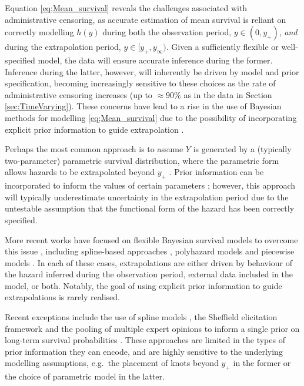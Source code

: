 \documentclass[ba,preprint]{imsart}
\theoremstyle{plain}
\theoremstyle{definition}
\theoremstyle{remark}
\begin{document}
Equation \eqref{eq;Mean_survival} reveals the challenges associated with administrative censoring, as accurate estimation of mean survival is reliant on correctly modelling $h(y)$ during both the observation period, $y \in (0,y_+)$, \textit{and} during the extrapolation period, $y \in [y_+,y_\infty)$. Given a sufficiently flexible or well-specified model, the data will ensure accurate inference during the former. Inference during the latter, however, will inherently be driven by model and prior specification, becoming increasingly sensitive to these choices as the rate of administrative censoring increases (up to $\approx 90\%$ as in the data in Section \ref{sec;TimeVarying}). These concerns have lead to a rise in the use of Bayesian methods for modelling \eqref{eq;Mean_survival} due to the possibility of incorporating explicit prior information to guide extrapolation \citep{Baio2020, Rutherford2020}.

Perhaps the most common approach is to assume $Y$ is generated by a (typically two-parameter) parametric survival distribution, where the parametric form allows hazards to be extrapolated beyond $y_+$ \citep{Latimer2011}. Prior information can be incorporated to inform the values of certain parameters \citep{Palmer2023}; however, this approach will typically underestimate uncertainty in the extrapolation period due to the untestable assumption that the functional form of the hazard has been correctly specified. 

More recent works have focused on flexible Bayesian survival models to overcome this issue \citep{Rutherford2020}, including spline-based approaches \citep{Jackson2023}, polyhazard models \citep{Demiris2015, Hardcastle2024} and piecewise models \citep{Cooney2023a, Kearns2019}. In each of these cases, extrapolations are either driven by behaviour of the hazard inferred during the observation period, external data included in the model, or both. Notably, the goal of using explicit prior information to guide extrapolations is rarely realised. 

{\color{red} Recent exceptions include the use of spline models \citep{cope2019, Jackson2023}, the Sheffield elicitation framework \citep{Oakley2025} and the pooling of multiple expert opinions to inform a single prior on long-term survival probabilities \citep{Cooney2023c}. These approaches are limited in the types of prior information they can encode, and are highly sensitive to the underlying modelling assumptions, e.g.~the placement of knots beyond $y_+$ in the former or the choice of parametric model in the latter.}
\end{document}
